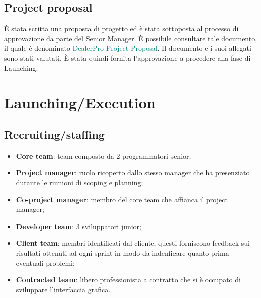 \documentclass{article}
\begin{document}
  \subsection{Project proposal}
  È stata scritta una proposta di progetto ed è stata sottoposta al processo di approvazione da parte del Senior Manager. 
  È possibile consultare tale documento, il quale è denominato  \textcolor{teal}{DealerPro Project Proposal}.
  Il documento e i suoi allegati sono stati valutati. È stata quindi fornita l’approvazione a procedere alla fase
  di Launching.


  \newpage
  \section{Launching/Execution}

  \subsection{Recruiting/staffing}

  \begin{itemize}
    \item \textbf{Core team}: team composto da 2 programmatori senior;
    \item \textbf{Project manager}: ruolo ricoperto dallo stesso manager che ha presenziato 
      durante le riunioni di scoping e planning;
    \item \textbf{Co-project manager}: membro del core team che affianca il project manager;
    \item \textbf{Developer team}: 3 sviluppatori junior;
    \item \textbf{Client team}: membri identificati dal cliente, questi forniscono feedback sui 
      risultati ottenuti ad ogni sprint in modo da indenficare quanto prima eventuali problemi;
    \item \textbf{Contracted team}: libero professionista a contratto che si è occupato di 
      sviluppare l'interfaccia grafica.
  \end{itemize}
\end{document}
